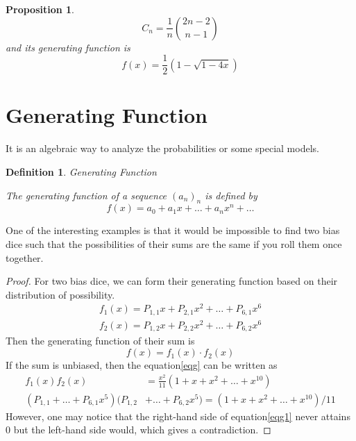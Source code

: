 \documentclass{article}
\newtheorem{definition}{Definition}[section]
\newtheorem{prop}{\bf Proposition}[section]
\begin{document}
        \begin{prop}
            \begin{equation*}
                C_n=\frac{1}{n}\binom{2n-2}{n-1}
            \end{equation*}
            and its generating function is
            \begin{equation*}
                f(x)=\frac{1}{2}(1-\sqrt{1-4x})
            \end{equation*}
        \end{prop}

        
    \section{Generating Function}
    It is an algebraic way to analyze the probabilities or some special models.
    \begin{definition}
        Generating Function

        The generating function of a sequence $(a_n)_n$ is defined by
        \begin{equation}
            f(x)=a_0+a_1x+\ldots+a_nx^n+\ldots
        \end{equation}
    \end{definition}

    One of the interesting examples is that it would be impossible to find two bias dice such that the possibilities of their sums are the same if you roll them once together.

    \begin{proof}
        For two bias dice, we can form their generating function based on their distribution of possibility.
        \begin{equation}
            \begin{split}
                f_1(x)=P_{1,1}x+P_{2,1}x^2+\ldots+P_{6,1}x^6\\
                f_2(x)=P_{1,2}x+P_{2,2}x^2+\ldots+P_{6,2}x^6
            \end{split}
        \end{equation}
        Then the generating function of their sum is
        \begin{equation}\label{eqg}
            f(x)=f_1(x)\cdot f_2(x)
        \end{equation}
        If the sum is unbiased, then the equation\eqref{eqg} can be written as
        \begin{equation}\label{eqg1}
            \begin{split}
                f_1(x)f_2(x)&=\frac{x^2}{11}(1+x+x^2+\ldots+x^{10})\\
                (P_{1,1}+\ldots+P_{6,1}x^5)(P_{1,2}&+\ldots+P_{6,2}x^5)=(1+x+x^2+\ldots+x^{10})/11
            \end{split}
        \end{equation}
        However, one may notice that the right-hand side of equation\eqref{eqg1} never attains 0 but the left-hand side would, which gives a contradiction.
    \end{proof}
    
\end{document}
